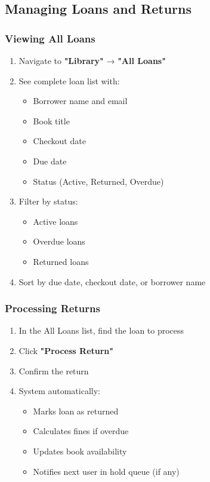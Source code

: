\documentclass[12pt,a4paper]{article}
\begin{document}
\subsection{Managing Loans and Returns}

\subsubsection{Viewing All Loans}
\begin{enumerate}[leftmargin=*]
    \item Navigate to \textbf{"Library"} → \textbf{"All Loans"}
    \item See complete loan list with:
        \begin{itemize}
            \item Borrower name and email
            \item Book title
            \item Checkout date
            \item Due date
            \item Status (Active, Returned, Overdue)
        \end{itemize}
    \item Filter by status:
        \begin{itemize}
            \item Active loans
            \item Overdue loans
            \item Returned loans
        \end{itemize}
    \item Sort by due date, checkout date, or borrower name
\end{enumerate}

\subsubsection{Processing Returns}
\begin{enumerate}[leftmargin=*]
    \item In the All Loans list, find the loan to process
    \item Click \textbf{"Process Return"}
    \item Confirm the return
    \item System automatically:
        \begin{itemize}
            \item Marks loan as returned
            \item Calculates fines if overdue
            \item Updates book availability
            \item Notifies next user in hold queue (if any)
        \end{itemize}
\end{enumerate}
\end{document}
